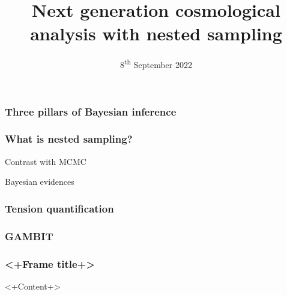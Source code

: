 \documentclass[aspectratio=169]{beamer}
\title{Next generation cosmological analysis with nested sampling}
\date{8\textsuperscript{th} September 2022}
\begin{document}
\begin{frame}
    \titlepage
\end{frame}

\begin{frame}
    \frametitle{Three pillars of Bayesian inference}
\end{frame}

\begin{frame}
    \frametitle{What is nested sampling?}
    Contrast with MCMC

    Bayesian evidences

\end{frame}

\begin{frame}
    \frametitle{Tension quantification}
\end{frame}

\begin{frame}
    \frametitle{GAMBIT}
\end{frame}


\begin{frame}
    \frametitle{<+Frame title+>}
    <+Content+>
\end{frame}
\end{document}
